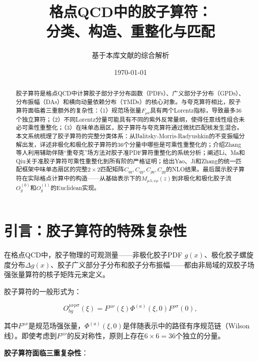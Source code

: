 \documentclass[12pt,a4paper]{ctexart}
\title{\heiti 格点QCD中的胶子算符：\\
分类、构造、重整化与匹配}
\author{基于本库文献的综合解析}
\date{\today}
\theoremstyle{definition}
\begin{document}
\maketitle

\begin{abstract}
\noindent
胶子算符是格点QCD中计算胶子部分子分布函数（PDFs）、广义部分子分布（GPDs）、分布振幅（DAs）和横向动量依赖分布（TMDs）的核心对象。与夸克算符相比，胶子算符面临着三重额外的复杂性：（1）规范场张量$F_{\mu\nu}$具有两个Lorentz指标，导致最多36个独立算符；（2）不同Lorentz分量可能具有不同的紫外反常量纲，使得任意线性组合未必可乘性重整化；（3）在味单态扇区，胶子算符与夸克算符通过微扰匹配核发生混合。本文系统梳理了胶子算符的完整分类体系：从Balitsky-Morris-Radyushkin的不变振幅分解出发，详述非极化和极化胶子算符的36个分量中哪些是可乘性重整化的；介绍Zhang等人利用辅助伴随``重夸克''场方法对胶子准PDF算符重整化的系统分析；阐述Li、Ma和Qiu关于准胶子算符可乘性重整化到所有阶的严格证明；给出Yao、Ji和Zhang的统一匹配框架中味单态扇区的完整$2\times2$匹配矩阵$C_{qq}, C_{qg}, C_{gq}, C_{gg}$的NLO结果。最后展示胶子算符在实际格点计算中的构造——从基础表示下的$M_{\mu\lambda;\nu\rho}(z)$到非极化和极化胶子流$O^{(0)}_g$和$O^{(1)}_g$的Euclidean实现。
\end{abstract}

\tableofcontents
\newpage

\section{引言：胶子算符的特殊复杂性}

在格点QCD中，胶子物理的可观测量——非极化胶子PDF $g(x)$、极化胶子螺旋度分布$\Delta g(x)$、胶子广义部分子分布和胶子分布振幅——都由非局域的双胶子场强张量算符的核子矩阵元来定义。

胶子算符的一般形式为\cite{Zhang2019,Li2018multiplicative}：

\begin{equation}
O^{\mu\nu\rho\sigma}_{bg}(\xi) = F^{\mu\nu}(\xi) \Phi^{(a)}(\xi, 0) F^{\rho\sigma}(0),
\label{eq:general_gluon_op}
\end{equation}

其中$F^{\mu\nu}$是规范场强张量，$\Phi^{(a)}(\xi, 0)$是伴随表示中的路径有序规范链（Wilson线）。即使考虑到$F^{\mu\nu}$的反对称性，原则上存在$6 \times 6 = 36$个独立的分量\cite{Li2018multiplicative}。

\textbf{胶子算符面临三重复杂性}\cite{Zhang2019,Li2018multiplicative,Wang2018}：
\end{document}
